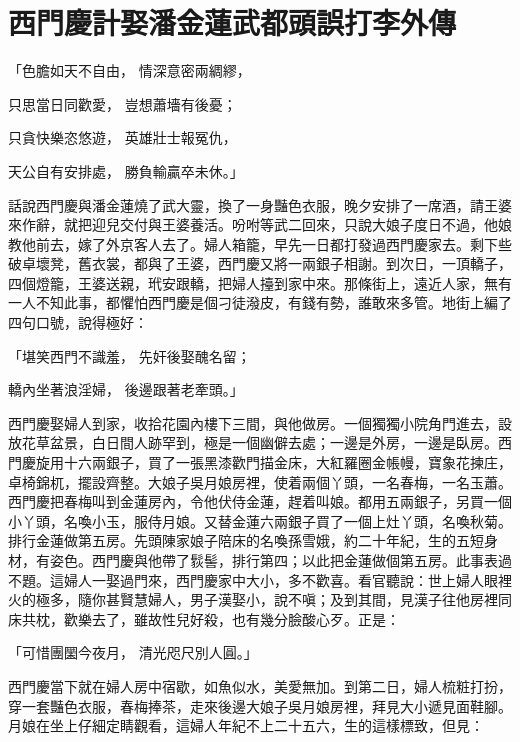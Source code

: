 %

\chapter{西門慶計娶潘金蓮\KG 武都頭誤打李外傳}

\begin{showcontents}{}




「色膽如天不自由，  情深意密兩綢繆，

只思當日同歡愛，  豈想蕭墻有後憂；

只貪快樂恣悠遊，  英雄壯士報冤仇，

天公自有安排處，  勝負輸贏卒未休。」

話說西門慶與潘金蓮燒了武大靈，換了一身豔色衣服，晚夕安排了一席酒，請王婆來作辭，就把迎兒交付與王婆養活。吩咐等武二回來，只說大娘子度日不過，他娘教他前去，嫁了外京客人去了。婦人箱籠，早先一日都打發過西門慶家去。剩下些破卓壞凳，舊衣裳，都與了王婆，西門慶又將一兩銀子相謝。到次日，一頂轎子，四個燈籠，王婆送親，玳安跟轎，把婦人擡到家中來。那條街上，遠近人家，無有一人不知此事，都懼怕西門慶是個刁徒潑皮，有錢有勢，誰敢來多管。地街上編了四句口號，說得極好：

「堪笑西門不識羞，  先奸後娶醜名留；

轎內坐著浪淫婦，  後邊跟著老牽頭。」

西門慶娶婦人到家，收拾花園內樓下三間，與他做房。一個獨獨小院角門進去，設放花草盆景，白日間人跡罕到，極是一個幽僻去處；一邊是外房，一邊是臥房。西門慶旋用十六兩銀子，買了一張黑漆歡門描金床，大紅羅圈金帳幔，寶象花揀庄，卓椅錦杌，擺設齊整。大娘子吳月娘房裡，使着兩個丫頭，一名春梅，一名玉蕭。西門慶把春梅叫到金蓮房內，令他伏侍金蓮，趕着叫娘。都用五兩銀子，另買一個小丫頭，名喚小玉，服侍月娘。又替金蓮六兩銀子買了一個上灶丫頭，名喚秋菊。排行金蓮做第五房。先頭陳家娘子陪床的名喚孫雪娥，約二十年紀，生的五短身材，有姿色。西門慶與他帶了䯼髻，排行第四；以此把金蓮做個第五房。此事表過不題。這婦人一娶過門來，西門慶家中大小，多不歡喜。看官聽說：世上婦人眼裡火的極多，隨你甚賢慧婦人，男子漢娶小，說不嗔；及到其間，見漢子往他房裡同床共枕，歡樂去了，雖故性兒好殺，也有幾分臉酸心歹。正是：

「可惜團圞今夜月，  清光咫尺別人圓。」

西門慶當下就在婦人房中宿歇，如魚似水，美愛無加。到第二日，婦人梳粧打扮，穿一套豔色衣服，春梅捧茶，走來後邊大娘子吳月娘房裡，拜見大小遞見面鞋腳。月娘在坐上仔細定睛觀看，這婦人年紀不上二十五六，生的這樣標致，但見：


\end{showcontents}
